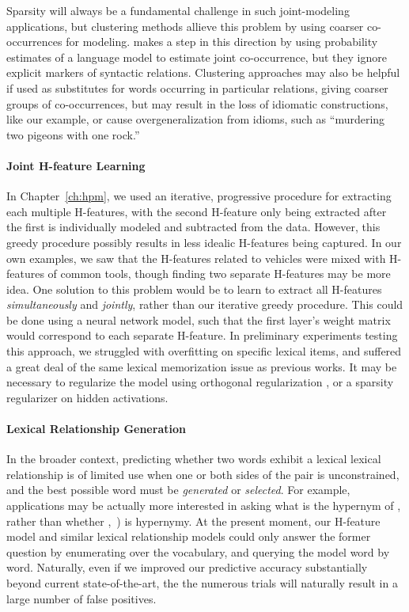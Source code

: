 Sparsity will always be a fundamental challenge in such joint-modeling
applications, but clustering methods allieve this problem by using coarser
co-occurrences for modeling.   makes a step in this
direction by using probability estimates of a language model to estimate joint
co-occurrence, but they ignore explicit markers of syntactic relations.
Clustering approaches may also be helpful if used as substitutes for words
occurring in particular relations, giving coarser groups of co-occurrences,
but may result in the loss of idiomatic constructions, like our example, or
cause overgeneralization from idioms, such as ``murdering two pigeons with one
rock.''

\paragraph{Joint H-feature Learning}

In Chapter~\ref{ch:hpm}, we used an iterative, progressive procedure for
extracting each multiple H-features, with the second H-feature only being
extracted after the first is individually modeled and subtracted from the data.
However, this greedy procedure possibly results in less idealic H-features
being captured. In our own examples, we saw that the H-features related to
vehicles were mixed with H-features of common tools, though finding two
separate H-features may be more idea. One solution to this problem would be
to learn to extract all H-features {\em simultaneously} and {\em jointly},
rather than our iterative greedy procedure. This could be done using a
neural network model, such that the first layer's weight matrix would
correspond to each separate H-feature. In preliminary experiments testing this
approach, we struggled with overfitting on specific lexical items, and suffered
a great deal of the same lexical memorization issue as previous works. It
may be necessary to regularize the model using orthogonal regularization
\cite{brock:2017:iclr}, or a sparsity regularizer on hidden activations.

\paragraph{Lexical Relationship Generation}

In the broader context, predicting whether two words exhibit a lexical
lexical relationship is of limited use when one or both sides of the pair
is unconstrained, and the best possible word must be {\em generated} or
{\em selected}. For example, applications may be actually more interested
in asking what is the hypernym of , rather than whether
,~) is hypernymy. At the present moment, our H-feature
model and similar lexical relationship models could only answer the former
question by enumerating over the vocabulary, and querying the model word by
word. Naturally, even if we improved our predictive accuracy substantially
beyond current state-of-the-art, the the numerous trials will naturally result
in a large number of false positives.

